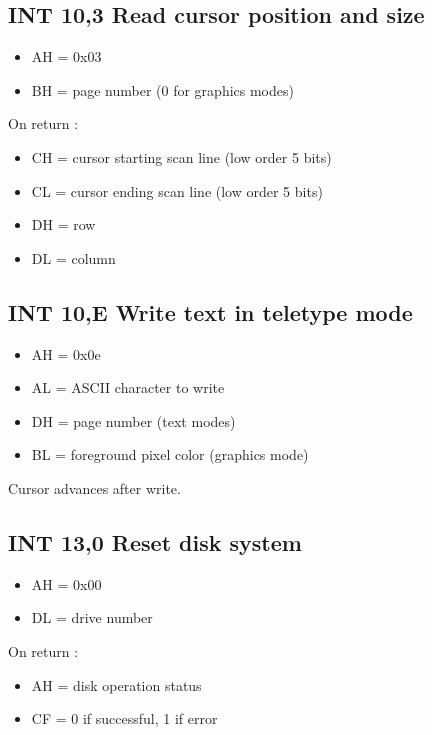 \subsection{INT 10,3 Read cursor position and size}
\begin{itemize}
  \item{AH = 0x03}
  \item{BH = page number (0 for graphics modes)}
\end{itemize}

On return :

\begin{itemize}
  \item{CH = cursor starting scan line (low order 5 bits)}
  \item{CL = cursor ending scan line (low order 5 bits)}
  \item{DH = row}
  \item{DL = column}
\end{itemize}


\subsection{INT 10,E Write text in teletype mode}
\begin{itemize}
  \item{AH = 0x0e}
  \item{AL = ASCII character to write}
  \item{DH = page number (text modes)}
  \item{BL = foreground pixel color (graphics mode)}
\end{itemize}

Cursor advances after write.

%
%
\subsection{INT 13,0 Reset disk system}
\begin{itemize}
  \item{AH = 0x00}
  \item{DL = drive number}
\end{itemize}

On return :

\begin{itemize}
  \item{AH = disk operation status}
  \item{CF = 0 if successful, 1 if error}
\end{itemize}

